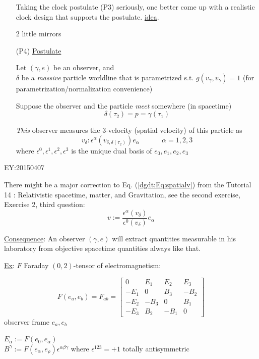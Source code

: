 \begin{enumerate}
		Taking the clock postulate (P3) seriously, one better come up with a realistic clock design that supports the postulate. 
		\underline{idea}.
		
		2 little mirrors
		\item[(P4)] \underline{Postulate}
		
		Let $(\gamma, e)$ be an observer, and \\
		$\delta$ be a \emph{massive} particle worldline that is parametrized s.t. $g(v_{\gamma}, v_{\gamma})=1$ (for parametrization/normalization convenience)
		
		Suppose the observer and the particle \emph{meet} somewhere (in spacetime)
		\[
		\delta(\tau_2) = p = \gamma(\tau_1)
		\]
		
		\emph{This} observer measures the 3-velocity (spatial velocity) of this particle as 
		\begin{equation}\label{dgdt:Eq:spatialv}
		v_{\delta}: \epsilon^{\alpha}( v_{\delta, \delta(\tau_2)} ) e_{\alpha} \quad \quad \quad \, \alpha =1,2,3
		\end{equation}
		where $\epsilon^0, \boxed{ \epsilon^1,\epsilon^2,\epsilon^3}$ is the unique dual basis of $e_0,\boxed{ e_1,e_2,e_3}$
	\end{enumerate}
	
	EY:20150407
	
	There might be a major correction to Eq. (\ref{dgdt:Eq:spatialv}) from the Tutorial 14 : Relativistic spacetime, matter, and Gravitation, see the second exercise, Exercise 2, third question:
	\begin{equation}
	v := \frac{ \epsilon^{\alpha}({v}_{\delta} ) }{ \epsilon^0({v}_{\delta}) } e_{\alpha}
	\end{equation}
	
	\underline{Consequence}:
	An observer $(\gamma, e)$ will extract quantities measurable in his laboratory from objective spacetime quantities always like that.
	
	\underline{Ex}: $F$ Faraday $(0,2)$-tensor of electromagnetism:
	
	\[
	F(e_a,e_b) = F_{ab} = \left[ \begin{matrix} 0 & E_1 & E_2 & E_3 \\ 
	-E_1 & 0 & B_3 & -B_2 \\ 
	-E_2 & -B_3 & 0 & B_1 \\
	-E_3 & B_2 & -B_1 & 0 \end{matrix} \right]
	\]
	observer frame $e_a,e_b$
	
	$E_{\alpha} := F(e_0,e_{\alpha})$ \\
	$B^{\gamma}:= F(e_{\alpha},e_{\rho})\epsilon^{\alpha \beta \gamma}$
	where 
	$\epsilon^{123} = +1$ totally antisymmetric
	
